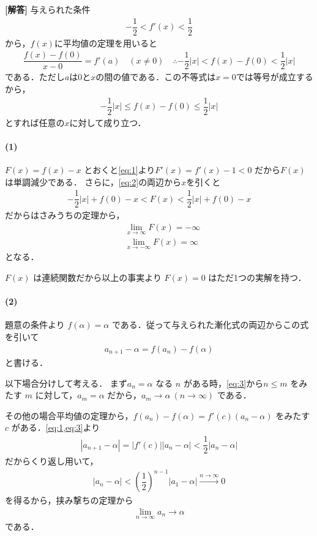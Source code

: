 \documentclass[../../main.tex]{subfiles}
\begin{document}
\begin{oframed}
  
\end{oframed}

{\bf [解答]}
与えられた条件
\begin{align}
  -\dfrac{1}{2} < f'(x) < \dfrac{1}{2} \label{eq:1}
\end{align}
から，$f(x)$に平均値の定理を用いると
\begin{align}
  \dfrac{f(x)- f(0)}{x-0} = f'(a) \quad (x \neq 0)
  \quad\therefore
  -\dfrac{1}{2}|x| < f(x)-f(0) < \dfrac{1}{2}|x|
\end{align}
である．ただし$a$は$0$と$x$の間の値である．この不等式は$x = 0$では等号が成立するから，
\begin{align}
  -\dfrac{1}{2}|x| \le f(x)-f(0) \le \dfrac{1}{2}|x| \label{eq:2}
\end{align}
とすれば任意の$x$に対して成り立つ．

\paragraph{(1)}
$F(x) = f(x) - x$ とおくと\cref{eq:1}より$F'(x) = f'(x) - 1 < 0$ だから$F(x)$ は単調減少である．
さらに，\cref{eq:2}の両辺から$x$を引くと
\begin{align}
  -\dfrac{1}{2}|x| + f(0) - x < F(x) < \dfrac{1}{2}|x| + f(0) - x
\end{align}
だからはさみうちの定理から，
\begin{align}
  &\lim_{x\to \infty}F(x) = -\infty \\
  &\lim_{x\to -\infty}F(x) = \infty
\end{align}
となる．

$F(x)$ は連続関数だから以上の事実より $F(x) = 0$ はただ1つの実解を持つ．

\paragraph{(2)}
題意の条件より $f(\alpha) = \alpha$ である．従って与えられた漸化式の両辺からこの式を引いて
\begin{align}
  a_{n+1} - \alpha = f(a_n) - f(\alpha) \label{eq:3}
\end{align}
と書ける．

以下場合分けして考える．
まず$a_n = \alpha$ なる $n$ がある時，\cref{eq:3}から$n \le m$ をみたす $m$ に対して，$a_m = \alpha$ だから，$a_m \to \alpha \ (n \to \infty)$ である．

その他の場合平均値の定理から，$f(a_n) - f(\alpha) = f'(c)(a_n - \alpha)$ をみたす $c$ がある．\cref{eq:1,eq:3}より
\begin{align}
  |a_{n+1} - \alpha| = |f'(c)||a_n - \alpha| < \dfrac{1}{2}|a_n - \alpha|
\end{align}
だからくり返し用いて，
\begin{align}
  |a_n - \alpha| < \left(\dfrac{1}{2}\right)^{n-1}|a_1 - \alpha| \xrightarrow{n \to \infty} 0
\end{align}
を得るから，挟み撃ちの定理から
\begin{align}
  \lim_{n \to \infty} a_n \longrightarrow \alpha
\end{align}
である．
\end{document}
